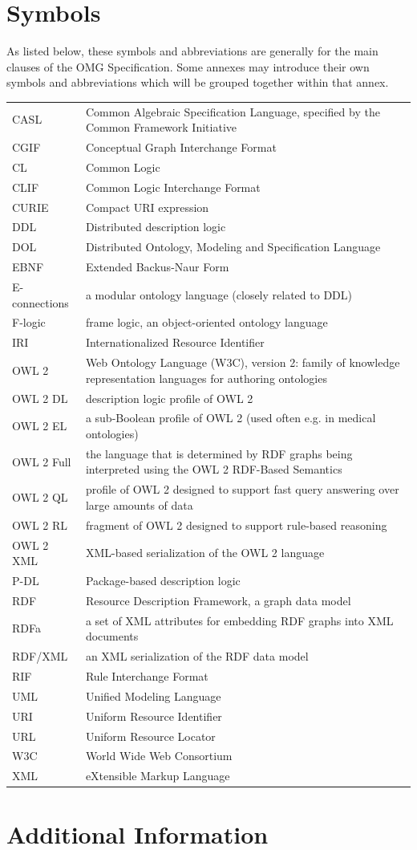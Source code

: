 \documentclass[10pt,%
\ifpretendfinal
final%
\else
draft%
\fi,
]{scrreprt}
\makeatletter
\newcommand*{\eg}{e.g.\@\xspace}
\newcommand*{\IS}{OMG Specification\xspace}
\newenvironment{symbols}[0]{\begin{longtable}{p{.15\textwidth}p{.84\textwidth}}}{\end{longtable}}
\newcommand{\symboldef}[2]{ #1 & #2 \\}
\makeatother
\begin{document}
\chapter{Symbols}

As listed below, these symbols and abbreviations are generally for the main clauses of the \IS. Some annexes may introduce their own symbols and abbreviations which will be grouped together within that annex.

\begin{symbols}
\symboldef{CASL}{Common Algebraic Specification Language, specified by the Common Framework Initiative}
\symboldef{CGIF}{Conceptual Graph Interchange Format}
\symboldef{CL}{Common Logic }
\symboldef{CLIF}{Common Logic Interchange Format}
\symboldef{CURIE}{Compact URI expression}
\symboldef{DDL}{Distributed description logic}
\symboldef{DOL}{Distributed Ontology, Modeling and Specification Language }
\symboldef{EBNF}{Extended Backus-Naur Form}
\symboldef{E-connections}{a modular ontology language (closely related to DDL)}
\symboldef{F-logic}{frame logic, an object-oriented ontology language}
\symboldef{IRI}{Internationalized Resource Identifier}
\symboldef{OWL 2}{Web Ontology Language (W3C), version 2: family of knowledge representation languages for authoring ontologies}
\symboldef{OWL 2 DL}{description logic profile of OWL 2}
\symboldef{OWL 2 EL}{a sub-Boolean profile of OWL 2 (used often \eg in medical ontologies)}
\symboldef{OWL 2 Full}{the language that is determined by RDF graphs being interpreted using the OWL 2 RDF-Based Semantics \cite{W3C:REC-owl2-rdf-based-semantics-20091027}}
\symboldef{OWL 2 QL}{profile of OWL 2 designed to support fast query answering over large amounts of data}
\symboldef{OWL 2 RL}{fragment of OWL 2 designed to support rule-based reasoning}
\symboldef{OWL 2 XML}{XML-based serialization of the OWL 2 language}
\symboldef{P-DL}{Package-based description logic}
\symboldef{RDF}{Resource Description Framework, a graph data model}
\symboldef{RDFa}{a set of XML attributes for embedding RDF graphs into XML documents}
\symboldef{RDF/XML}{an XML serialization of the RDF data model}
\symboldef{RIF}{Rule Interchange Format}
\symboldef{UML}{Unified Modeling Language}
\symboldef{URI}{Uniform Resource Identifier}
\symboldef{URL}{Uniform Resource Locator}
\symboldef{W3C}{World Wide Web Consortium}
\symboldef{XML}{eXtensible Markup Language}
\end{symbols}


\chapter{Additional Information}
\end{document}
